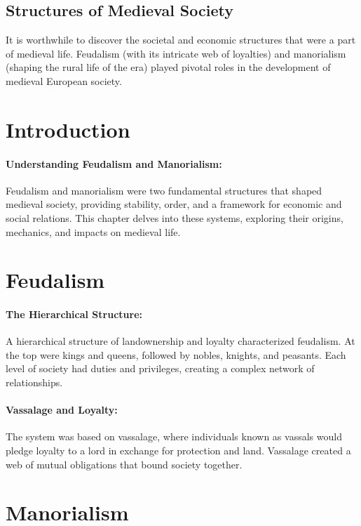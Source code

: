 \documentclass[a4paper,12pt]{book}
\begin{document}
\subsection*{Structures of Medieval Society}
It is worthwhile to discover the societal and economic structures that were a part of medieval life. Feudalism (with its intricate web of loyalties) and manorialism (shaping the rural life of the era) played pivotal roles in the development of medieval European society.

\section*{Introduction}

\paragraph{Understanding Feudalism and Manorialism:}
Feudalism and manorialism were two fundamental structures that shaped medieval society, providing stability, order, and a framework for economic and social relations. This chapter delves into these systems, exploring their origins, mechanics, and impacts on medieval life.

\section*{Feudalism}

\paragraph{The Hierarchical Structure:}
A hierarchical structure of landownership and loyalty characterized feudalism. At the top were kings and queens, followed by nobles, knights, and peasants. Each level of society had duties and privileges, creating a complex network of relationships.

\paragraph{Vassalage and Loyalty:}
The system was based on vassalage, where individuals known as vassals would pledge loyalty to a lord in exchange for protection and land. Vassalage created a web of mutual obligations that bound society together.

\section*{Manorialism}
\end{document}
